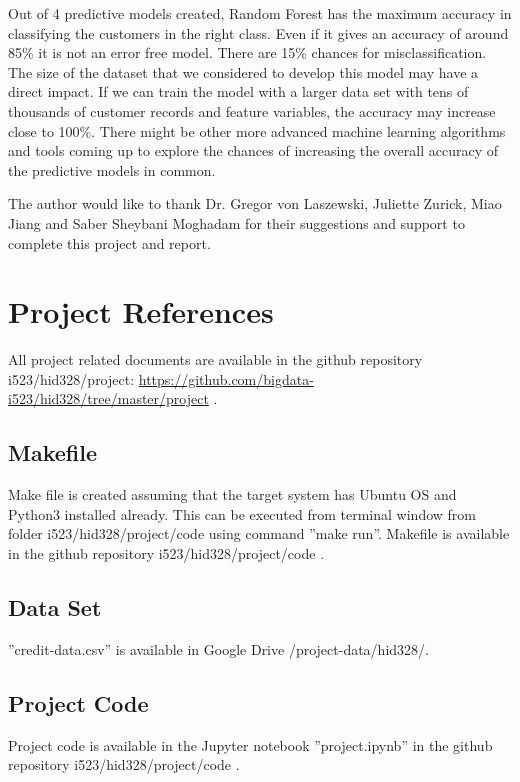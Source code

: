 \documentclass[sigconf]{acmart}
\begin{document}
Out of 4 predictive models created, Random Forest has the maximum accuracy in classifying the customers in the right class. Even if it gives an accuracy of around 85\% it is not an error free model. There are 15\% chances for misclassification. The size of the dataset that we considered to develop this model may have a direct impact. If we can train the model with a larger data set with tens of thousands of customer records and feature variables, the accuracy may increase close to 100\%. There might be other more advanced machine learning algorithms and tools coming up to explore the chances of increasing the overall accuracy of the predictive models in common.


\begin{acks}

The author would like to thank Dr. Gregor von Laszewski, Juliette Zurick, Miao Jiang and Saber Sheybani Moghadam for their suggestions and support to complete this project and report.

\end{acks}


 

\appendix

\section{Project References}

All project related documents are available in the github repository i523/hid328/project:  \url{https://github.com/bigdata-i523/hid328/tree/master/project} \cite{github}.

\subsection{Makefile}\label{Makefile}

Make file is created assuming that the target system has Ubuntu OS and Python3 installed already. This can be executed from terminal window from folder i523/hid328/project/code using command ''make run''. Makefile is available in the github repository i523/hid328/project/code \cite{code}.

\subsection{Data Set}

''credit-data.csv'' is available in Google Drive /project-data/hid328/.

\subsection{Project Code}\label{Project Code}

Project code is available in the Jupyter notebook ''project.ipynb'' in the github repository i523/hid328/project/code \cite{code}.
\end{document}
